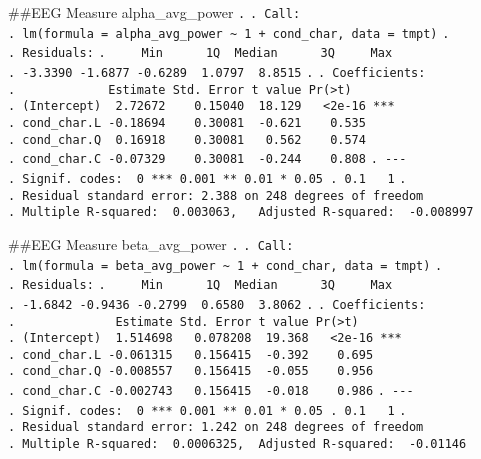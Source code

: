 \documentclass[
]{article}
\begin{document}
\#\#EEG Measure alpha\_avg\_power \texttt{.} \texttt{.\ Call:}
\texttt{.\ lm(formula\ =\ alpha\_avg\_power\ \textasciitilde{}\ 1\ +\ cond\_char,\ data\ =\ tmpt)}
\texttt{.} \texttt{.\ Residuals:}
\texttt{.\ \ \ \ \ Min\ \ \ \ \ \ 1Q\ \ Median\ \ \ \ \ \ 3Q\ \ \ \ \ Max}
\texttt{.\ -3.3390\ -1.6877\ -0.6289\ \ 1.0797\ \ 8.8515} \texttt{.}
\texttt{.\ Coefficients:}
\texttt{.\ \ \ \ \ \ \ \ \ \ \ \ \ Estimate\ Std.\ Error\ t\ value\ Pr(\textgreater{}\textbar{}t\textbar{})}
\texttt{.\ (Intercept)\ \ 2.72672\ \ \ \ 0.15040\ \ 18.129\ \ \ \textless{}2e-16\ ***}
\texttt{.\ cond\_char.L\ -0.18694\ \ \ \ 0.30081\ \ -0.621\ \ \ \ 0.535}
\texttt{.\ cond\_char.Q\ \ 0.16918\ \ \ \ 0.30081\ \ \ 0.562\ \ \ \ 0.574}
\texttt{.\ cond\_char.C\ -0.07329\ \ \ \ 0.30081\ \ -0.244\ \ \ \ 0.808}
\texttt{.\ -\/-\/-}
\texttt{.\ Signif.\ codes:\ \ 0\ \textquotesingle{}***\textquotesingle{}\ 0.001\ \textquotesingle{}**\textquotesingle{}\ 0.01\ \textquotesingle{}*\textquotesingle{}\ 0.05\ \textquotesingle{}.\textquotesingle{}\ 0.1\ \textquotesingle{}\ \textquotesingle{}\ 1}
\texttt{.}
\texttt{.\ Residual\ standard\ error:\ 2.388\ on\ 248\ degrees\ of\ freedom}
\texttt{.\ Multiple\ R-squared:\ \ 0.003063,\ \ \ Adjusted\ R-squared:\ \ -0.008997}

\#\#EEG Measure beta\_avg\_power \texttt{.} \texttt{.\ Call:}
\texttt{.\ lm(formula\ =\ beta\_avg\_power\ \textasciitilde{}\ 1\ +\ cond\_char,\ data\ =\ tmpt)}
\texttt{.} \texttt{.\ Residuals:}
\texttt{.\ \ \ \ \ Min\ \ \ \ \ \ 1Q\ \ Median\ \ \ \ \ \ 3Q\ \ \ \ \ Max}
\texttt{.\ -1.6842\ -0.9436\ -0.2799\ \ 0.6580\ \ 3.8062} \texttt{.}
\texttt{.\ Coefficients:}
\texttt{.\ \ \ \ \ \ \ \ \ \ \ \ \ \ Estimate\ Std.\ Error\ t\ value\ Pr(\textgreater{}\textbar{}t\textbar{})}
\texttt{.\ (Intercept)\ \ 1.514698\ \ \ 0.078208\ \ 19.368\ \ \ \textless{}2e-16\ ***}
\texttt{.\ cond\_char.L\ -0.061315\ \ \ 0.156415\ \ -0.392\ \ \ \ 0.695}
\texttt{.\ cond\_char.Q\ -0.008557\ \ \ 0.156415\ \ -0.055\ \ \ \ 0.956}
\texttt{.\ cond\_char.C\ -0.002743\ \ \ 0.156415\ \ -0.018\ \ \ \ 0.986}
\texttt{.\ -\/-\/-}
\texttt{.\ Signif.\ codes:\ \ 0\ \textquotesingle{}***\textquotesingle{}\ 0.001\ \textquotesingle{}**\textquotesingle{}\ 0.01\ \textquotesingle{}*\textquotesingle{}\ 0.05\ \textquotesingle{}.\textquotesingle{}\ 0.1\ \textquotesingle{}\ \textquotesingle{}\ 1}
\texttt{.}
\texttt{.\ Residual\ standard\ error:\ 1.242\ on\ 248\ degrees\ of\ freedom}
\texttt{.\ Multiple\ R-squared:\ \ 0.0006325,\ \ Adjusted\ R-squared:\ \ -0.01146}
\end{document}
